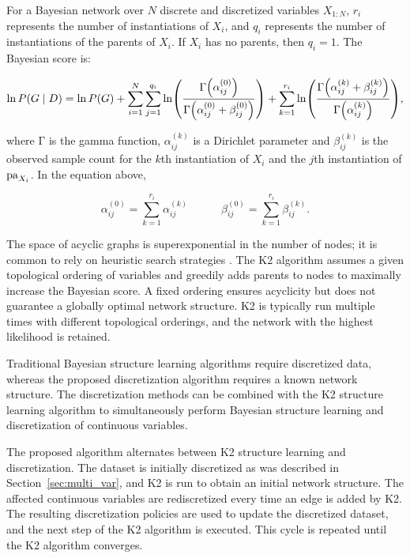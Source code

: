 For a Bayesian network over $N$ discrete and discretized variables $X_{1:N}$, $r_i$ represents the number of instantiations of $X_i$, and $q_i$ represents the number of instantiations of the parents of $X_i$.
If $X_i$ has no parents, then $q_i = 1$.
The Bayesian score is:

\begin{small}
\begin{equation}
\label{eq:BayesianScore}
  \ln P(G\mid D) = \ln P(G) + \sum_{i=1}^N \sum_{j=1}^{q_i} \ln \paren{
    \frac{
      \mathrm{\Gamma}\paren{\alpha_{ij}^{(0)}}
    }{
      \mathrm{\Gamma}\paren{\alpha_{ij}^{(0)} + \beta_{ij}^{(0)}}
    }
  } + \sum_{k=1}^{r_i} \ln \paren{
    \frac{
      \mathrm{\Gamma}\paren{\alpha_{ij}^{(k)} + \beta_{ij}^{(k)}}
    }{
      \mathrm{\Gamma}\paren{\alpha_{ij}^{(k)}}
    }
  }\text{,}
\end{equation}
\end{small}

\noindent
where $\mathrm{\Gamma}$ is the gamma function, $\alpha_{ij}^{(k)}$ is a Dirichlet parameter and $\beta_{ij}^{(k)}$ is the observed sample count for the $k$th instantiation of $X_i$ and the $j$th instantiation of $\operatorname{pa}_{X_i}$.
In the equation above,

\begin{equation}
\alpha_{ij}^{(0)} = \sum_{k=1}^{r_i} \alpha_{ij}^{(k)} \quad \qquad \beta_{ij}^{(0)} = \sum_{k=1}^{r_i} \beta_{ij}^{(k)}\text{.}
\end{equation}

The space of acyclic graphs is superexponential in the number of nodes; it is common to rely on heuristic search strategies \citep{PGM_2009}.
The K2 algorithm assumes a given topological ordering of variables and greedily adds parents to nodes to maximally increase the Bayesian score.
A fixed ordering ensures acyclicity but does not guarantee a globally optimal network structure.
K2 is typically run multiple times with different topological orderings, and the network with the highest likelihood is retained.

Traditional Bayesian structure learning algorithms require discretized data, whereas the proposed discretization algorithm requires a known network structure.
The discretization methods can be combined with the K2 structure learning algorithm \citep{cooper1992bayesian} to simultaneously perform Bayesian structure learning and discretization of continuous variables.

The proposed algorithm alternates between K2 structure learning and discretization.
The dataset is initially discretized as was described in Section~\ref{sec:multi_var}, and K2 is run to obtain an initial network structure.
The affected continuous variables are rediscretized every time an edge is added by K2.
The resulting discretization policies are used to update the discretized dataset, and the next step of the K2 algorithm is executed.
This cycle is repeated until the K2 algorithm converges.

